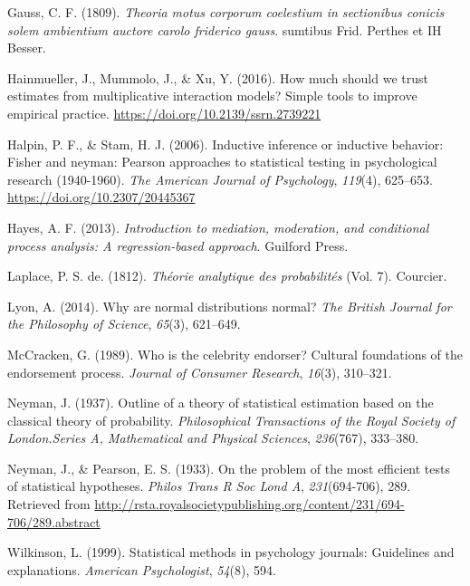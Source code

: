 \documentclass[a4paper]{book}
\theoremstyle{definition}
\theoremstyle{definition}
\theoremstyle{definition}
\theoremstyle{remark}
\begin{document}
\hypertarget{ref-RefWorks:3936}{}
Gauss, C. F. (1809). \emph{Theoria motus corporum coelestium in
sectionibus conicis solem ambientium auctore carolo friderico gauss}.
sumtibus Frid. Perthes et IH Besser.

\hypertarget{ref-RefWorks:3838}{}
Hainmueller, J., Mummolo, J., \& Xu, Y. (2016). How much should we trust
estimates from multiplicative interaction models? Simple tools to
improve empirical practice. \url{https://doi.org/10.2139/ssrn.2739221}

\hypertarget{ref-RefWorks:3931}{}
Halpin, P. F., \& Stam, H. J. (2006). Inductive inference or inductive
behavior: Fisher and neyman: Pearson approaches to statistical testing
in psychological research (1940-1960). \emph{The American Journal of
Psychology}, \emph{119}(4), 625--653.
\url{https://doi.org/10.2307/20445367}

\hypertarget{ref-RefWorks:3873}{}
Hayes, A. F. (2013). \emph{Introduction to mediation, moderation, and
conditional process analysis: A regression-based approach}. Guilford
Press.

\hypertarget{ref-RefWorks:3937}{}
Laplace, P. S. de. (1812). \emph{Théorie analytique des probabilités}
(Vol. 7). Courcier.

\hypertarget{ref-RefWorks:3935}{}
Lyon, A. (2014). Why are normal distributions normal? \emph{The British
Journal for the Philosophy of Science}, \emph{65}(3), 621--649.

\hypertarget{ref-RefWorks:3941}{}
McCracken, G. (1989). Who is the celebrity endorser? Cultural
foundations of the endorsement process. \emph{Journal of Consumer
Research}, \emph{16}(3), 310--321.

\hypertarget{ref-RefWorks:3929}{}
Neyman, J. (1937). Outline of a theory of statistical estimation based
on the classical theory of probability. \emph{Philosophical Transactions
of the Royal Society of London.Series A, Mathematical and Physical
Sciences}, \emph{236}(767), 333--380.

\hypertarget{ref-RefWorks:3906}{}
Neyman, J., \& Pearson, E. S. (1933). On the problem of the most
efficient tests of statistical hypotheses. \emph{Philos Trans R Soc Lond
A}, \emph{231}(694-706), 289. Retrieved from
\url{http://rsta.royalsocietypublishing.org/content/231/694-706/289.abstract}

\hypertarget{ref-RefWorks:3934}{}
Wilkinson, L. (1999). Statistical methods in psychology journals:
Guidelines and explanations. \emph{American Psychologist}, \emph{54}(8),
594.
\end{document}
